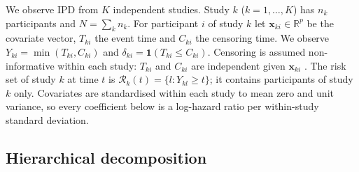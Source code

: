 \documentclass[11pt]{article}
\theoremstyle{remark}
\numberwithin{equation}{section}
\newcommand{\bx}{\mathbf{x}}
\begin{document}
We observe IPD from $K$ independent studies. Study $k$ ($k=1,\dots,K$) has $n_k$
participants and $N=\sum_k n_k$. For participant $i$ of study $k$ let
$\bx_{ki}\in\mathbb{R}^p$ be the covariate vector, $T_{ki}$ the event time and
$C_{ki}$ the censoring time. We observe $Y_{ki}=\min(T_{ki},C_{ki})$ and
$\delta_{ki}=\mathbf{1}(T_{ki}\le C_{ki})$. Censoring is assumed
non-informative within each study: $T_{ki}$ and $C_{ki}$ are independent given
$\bx_{ki}$ \citep{Kalbfleisch2002}. The risk set of study $k$ at time $t$ is
$\mathcal{R}_k(t)=\{l: Y_{kl}\ge t\}$; it contains participants of study $k$
only. Covariates are standardised within each study to mean zero and unit
variance, so every coefficient below is a log-hazard ratio per within-study
standard deviation.

\subsection{Hierarchical decomposition}
\label{subsec:decomp}
\end{document}
